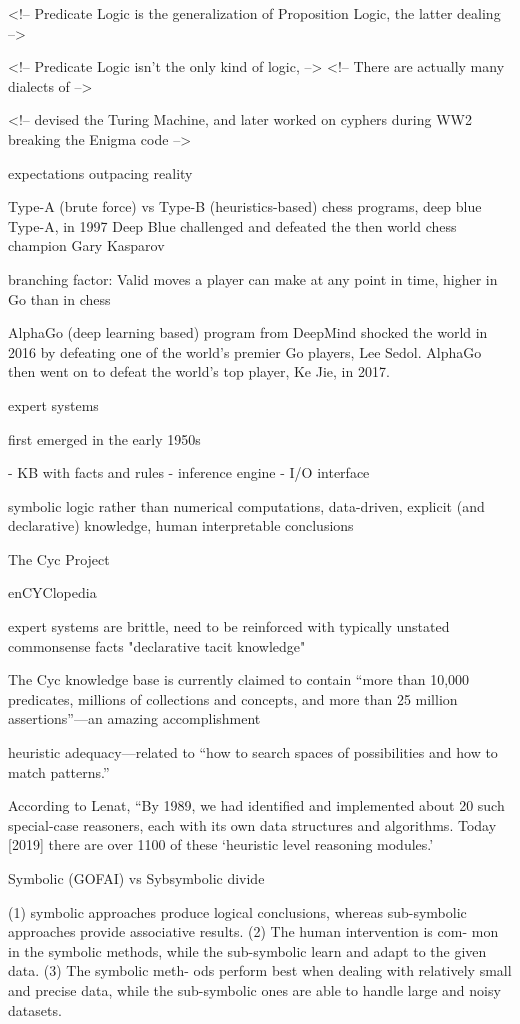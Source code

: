<!-- Predicate Logic is the generalization of Proposition Logic, the latter dealing -->




<!-- Predicate Logic isn't the only kind of logic,  -->
<!-- There are actually many dialects of  -->




<!-- devised the Turing Machine, and later worked on cyphers during WW2 breaking the Enigma code -->

expectations outpacing reality

Type-A (brute force) vs Type-B (heuristics-based) chess programs, deep blue Type-A, in 1997 Deep Blue challenged and defeated the then world chess champion Gary Kasparov

branching factor: Valid moves a player can make at any point in time, higher in Go than in chess

AlphaGo (deep learning based) program from DeepMind shocked the world in 2016 by defeating one of the world’s premier Go players, Lee Sedol. AlphaGo then went on to defeat the world’s top player, Ke Jie, in 2017.  \cite{brachman2022machines}

expert systems

first emerged in the early 1950s 

- KB with facts and rules
- inference engine 
- I/O interface

symbolic logic rather than numerical computations, data-driven, explicit (and declarative) knowledge, human interpretable conclusions


\cite{brachman2022machines}


The Cyc Project

\cite{brachman2022machines}

enCYClopedia

expert systems are brittle, need to be reinforced with typically unstated commonsense facts "declarative tacit knowledge"  

The Cyc knowledge base is currently claimed to contain “more than 10,000 predicates, millions of collections and concepts, and more than 25 million assertions”—an amazing accomplishment \cite{brachman2022machines}

heuristic adequacy—related to “how to search spaces of possibilities and
how to match patterns.”

 According to Lenat,
“By 1989, we had identified and implemented about 20 such special-case
reasoners, each with its own data structures and algorithms. Today [2019]
there are over 1100 of these ‘heuristic level reasoning modules.’


Symbolic (GOFAI) vs Sybsymbolic divide

(1) symbolic approaches produce logical
conclusions, whereas sub-symbolic approaches provide
associative results. (2) The human intervention is com-
mon in the symbolic methods, while the sub-symbolic
learn and adapt to the given data. (3) The symbolic meth-
ods perform best when dealing with relatively small and
precise data, while the sub-symbolic ones are able to
handle large and noisy datasets.

